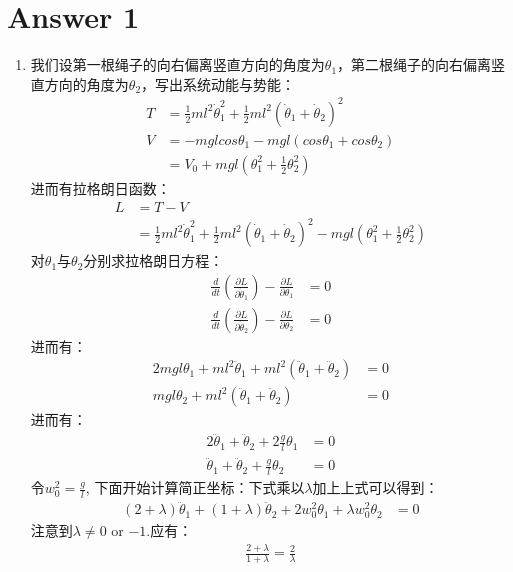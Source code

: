 \section*{Answer 1}
\begin{enumerate}
	\item 我们设第一根绳子的向右偏离竖直方向的角度为\(\theta_1\)，第二根绳子的向右偏离竖直方向的角度为\(\theta_2\)，写出系统动能与势能：
	\begin{align*}
		T &= \frac{1}{2}ml^{2}\dot{\theta}_1^2 + \frac{1}{2}ml^{2}(\dot{\theta}_1+\dot{\theta}_2)^2 \\
		V &= -mglcos\theta_1 - mgl(cos\theta_1+cos\theta_2) \\
		  &= V_{0} + mgl(\theta_1^2 + \frac{1}{2}\theta_2^2) 
	\end{align*}
	进而有拉格朗日函数：
	\begin{align*}
		L &= T - V \\
		  &= \frac{1}{2}ml^{2}\dot{\theta}_1^2 + \frac{1}{2}ml^{2}(\dot{\theta}_1+\dot{\theta}_2)^2 - mgl(\theta_1^2 + \frac{1}{2}\theta_2^2) 
	\end{align*}
	对\(\theta_1\)与\(\theta_2\)分别求拉格朗日方程：
	\begin{align*}
		\frac{d}{dt}(\frac{\partial L}{\partial \dot{\theta}_1}) - \frac{\partial L}{\partial \theta_1} &= 0 \\
		\frac{d}{dt}(\frac{\partial L}{\partial \dot{\theta}_2}) - \frac{\partial L}{\partial \theta_2} &= 0 
	\end{align*}
	进而有：
	\begin{align*}
		2mgl\theta_1 + ml^{2}\ddot{\theta}_1 + ml^{2}(\ddot{\theta}_1+\ddot{\theta}_2) &= 0 \\
		mgl\theta_2 + ml^{2}(\ddot{\theta}_1+\ddot{\theta}_2) &= 0 
	\end{align*}
	进而有：
	\begin{align*}
		2\ddot{\theta}_1 + \ddot{\theta}_2 + 2\frac{g}{l}\theta_1 &= 0 \\
		\ddot{\theta}_1 + \ddot{\theta}_2 + \frac{g}{l}\theta_2 &= 0 
	\end{align*}
	令\(w_{0}^2= \frac{g}{l}\), 下面开始计算简正坐标：下式乘以\(\lambda\)加上上式可以得到：
	\begin{align*}
		(2+\lambda)\ddot{\theta}_1 + (1+\lambda)\ddot{\theta}_2 + 2w_{0}^2\theta_1 + \lambda w_{0}^2\theta_2 &= 0 
	\end{align*}
	注意到\(\lambda \neq 0 \) or \(-1\).应有：
	\begin{align*}
		\frac{2+\lambda}{1+\lambda} = \frac{2}{\lambda}

\end{align*}
\end{enumerate}
